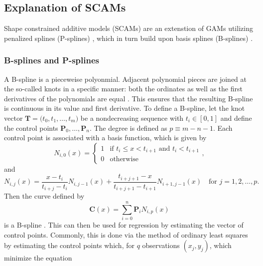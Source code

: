 \subsection{Explanation of SCAMs}

Shape constrained additive models (SCAMs) \parencite{Pya2010,Pya2015} are an extenstion of GAMs utilizing penalized splines (P-splines) \parencite{Eilers1996}, which in turn build upon basis splines (B-splines) \parencite{Boor2001,Curry1947}.

\subsubsection{B-splines and P-splines}
\label{sec:BSplinesPSplines}

A B-spline is a pieceweise polyonmial.  Adjacent polynomial pieces are joined at the so-called knots in a specific manner:  both the ordinates as well as the first derivatives of the polynomials are equal \parencite{Eilers1996}.  This ensures that the resulting B-spline is continuous in its value and first derivative.  To define a B-spline, let the knot vector \(\symbf{T} = \bigl(t_0, t_1, \ldots, t_m\bigr)\) be a nondecreasing sequence with \(t_i \in [0, 1]\) and define the control points \(\symbf{P}_0, \ldots, \symbf{P}_n\).  The degree is defined as \(p \equiv m - n - 1\).  Each control point is associated with a basis function, which is given by
\begin{equation}
  \label{eq:BSplineBasisFunctionsDegreeZero}
  N_{i, 0}(x) =
  \begin{cases}
    1 &\text{if } t_i \leq x < t_{i + 1} \text{ and } t_i < t_{i + 1} \\
    0 &\text{otherwise}
  \end{cases},
\end{equation}
and
\begin{equation}
  \label{eq:BSplineBasisFunctionsDegreeNonzero}
  N_{i, j}(x) = \frac{x - t_i}{t_{i + j} - t_i} N_{i, j - 1}(x) + \frac{t_{i + j + 1} - x}{t_{i + j + 1} - t_{i + 1}} N_{i + 1, j - 1}(x) \quad \text{for } j = 1, 2, \ldots, p.
\end{equation}
Then the curve defined by
\begin{equation}
  \label{eq:BSplineCurveDefinition}
  \symbf{C}(x) = \sum_{i = 0}^n \symbf{P}_i N_{i, p}(x)
\end{equation}
is a B-spline \parencite{Weisstein2017a}.  This can then be used for regression by estimating the vector of control points.  Commonly, this is done via the method of ordinary least squares \parencite{Bollaerts2006} by estimating the control points which, for \(q\) observations \((x_j, y_j)\), which minimize the equation
